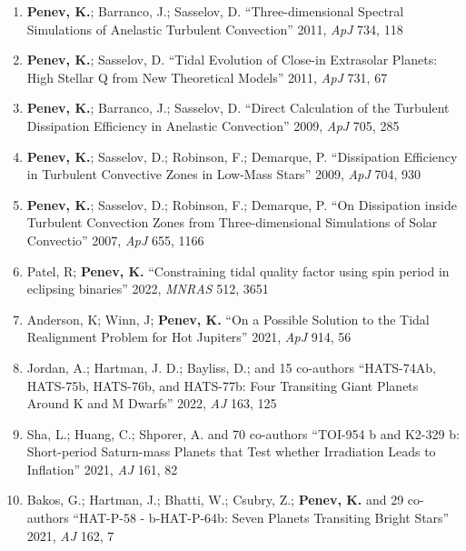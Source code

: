 \begin{enumerate}
	\item \textbf{Penev, K.}; Barranco, J.; Sasselov, D. ``Three-dimensional
		Spectral Simulations of Anelastic Turbulent Convection'' 2011, {\em
		ApJ} 734, 118

	\item \textbf{Penev, K.}; Sasselov, D. ``Tidal Evolution of Close-in
		Extrasolar Planets: High Stellar Q from New Theoretical Models''
		2011, {\em ApJ} 731, 67

	\item \textbf{Penev, K.}; Barranco, J.; Sasselov, D. ``Direct Calculation
		of the Turbulent Dissipation Efficiency in Anelastic Convection''
		2009, {\em ApJ} 705, 285

	\item \textbf{Penev, K.}; Sasselov, D.; Robinson, F.; Demarque, P.
		``Dissipation Efficiency in Turbulent Convective Zones in Low-Mass
		Stars'' 2009, {\em ApJ} 704, 930

	\item \textbf{Penev, K.}; Sasselov, D.; Robinson, F.; Demarque, P. ``On
		Dissipation inside Turbulent Convection Zones from Three-dimensional
		Simulations of Solar Convectio'' 2007, {\em ApJ} 655, 1166

    \item Patel, R; \textbf{Penev, K.} ``Constraining tidal quality factor using
        spin period in eclipsing binaries'' 2022, {\em MNRAS} 512, 3651

    \item Anderson, K; Winn, J; \textbf{Penev, K.} ``On a Possible Solution to
        the Tidal Realignment Problem for Hot Jupiters'' 2021, {\em ApJ} 914, 56

    \item Jordan, A.; Hartman, J. D.; Bayliss, D.; and 15 co-authors
        ``HATS-74Ab, HATS-75b, HATS-76b, and HATS-77b: Four Transiting Giant
        Planets Around K and M Dwarfs'' 2022, {\em AJ} 163, 125

    \item Sha, L.; Huang, C.; Shporer, A. and 70 co-authors ``TOI-954 b and
        K2-329 b: Short-period Saturn-mass Planets that Test whether Irradiation
        Leads to Inflation'' 2021, {\em AJ} 161, 82

    \item Bakos, G.; Hartman, J.; Bhatti, W.; Csubry, Z.; \textbf{Penev, K.} and
        29 co-authors ``HAT-P-58 - b-HAT-P-64b: Seven Planets Transiting Bright
        Stars'' 2021, {\em AJ} 162, 7


\end{enumerate}
